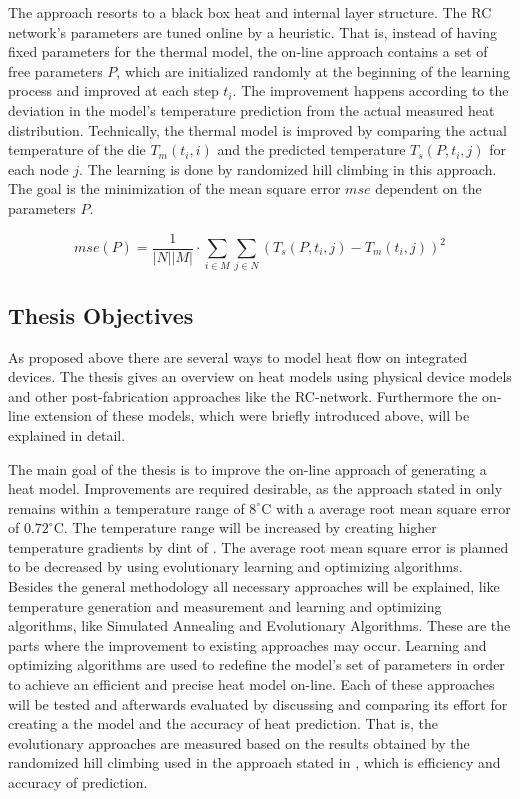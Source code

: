 \documentclass[12pt,twoside,doublepage]{article}
\begin{document}
The approach resorts to a black box heat and internal layer structure. The RC network's parameters are tuned online by a heuristic.
That is, instead of having fixed parameters for the thermal model, the on-line approach contains a set of free parameters $P$, which are initialized randomly at the beginning of the learning process and improved at each step $t_i$.
The improvement happens according to the deviation in the model's temperature prediction from the actual measured heat distribution.
Technically, the thermal model is improved by comparing the actual temperature of the die $T_m(t_i,i)$ and the predicted temperature $T_s(P,t_i,j)$ for each node $j$. The learning is done by randomized hill climbing in this approach. The goal is the minimization of the mean square error $mse$ dependent on the parameters $P$.
 
\begin{equation}
\label{eq:mse}
mse(P)=\frac{1}{|N||M|} \cdot \sum_{i\in M} \sum_{j\in N} (T_s(P,t_i,j)-T_m(t_i,j))^2
\end{equation}
 
 
\subsection{Thesis Objectives}
\label{sec:objectives}
 
As proposed above there are several ways to model heat flow on integrated devices.
The thesis gives an overview on heat models using physical device models and other post-fabrication approaches like the RC-network. Furthermore the on-line extension of these models, which were briefly introduced above, will be explained in detail.
 
The main goal of the thesis is to improve the on-line approach of generating a heat model. Improvements are required desirable, as the approach stated in \cite{Happe} only remains within a temperature range of $8^\circ$C with a average root mean square error of $0.72^\circ$C. The temperature range will be increased by creating higher temperature gradients by dint of \cite{Agne2013}. The average root mean square error is planned to be decreased by using evolutionary learning and optimizing algorithms.
Besides the general methodology all necessary approaches will be explained, like temperature generation and measurement and learning and optimizing algorithms, like Simulated Annealing and Evolutionary Algorithms. These are the parts where the improvement to existing approaches may occur. Learning and optimizing algorithms are used to redefine the model's set of parameters in order to achieve an efficient and precise heat model on-line. Each of these approaches will be tested and afterwards evaluated by discussing and comparing its effort for creating a the model and the accuracy of heat prediction. That is, the evolutionary approaches are measured based on the results obtained by the randomized hill climbing used in the approach stated in \cite{Happe}, which is efficiency and accuracy of prediction.
 
\end{document}
